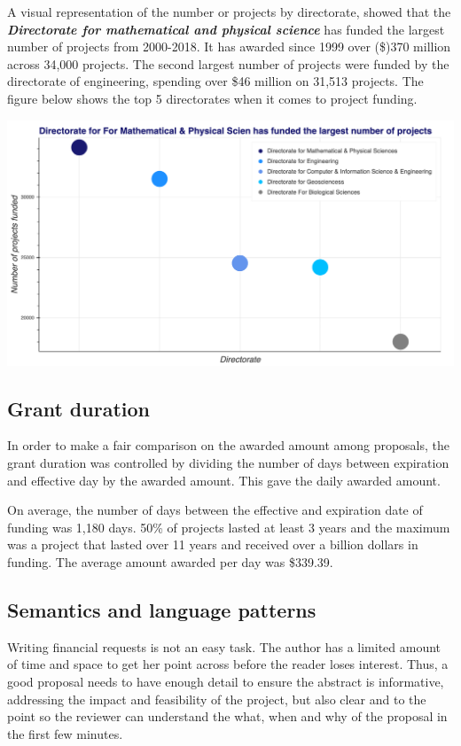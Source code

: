 \documentclass[11pt, oneside]{article}   	%
\begin{document}
A visual representation of the number or projects by directorate, showed that the  \textbf{\emph{Directorate for mathematical and physical science}} has funded the largest number of projects from 2000-2018.  It has awarded since 1999 over (\$)370 million across 34,000 projects. The second largest number of projects were funded by the directorate of engineering, spending over \$46 million on 31,513 projects. The figure below shows the top 5 directorates when it comes to project funding.
 
\includegraphics[width=\textwidth]{awardsperdir}
 
\subsection{Grant duration}
 
In order to make a fair comparison on the awarded amount among proposals, the grant duration was controlled by dividing the number of days between expiration and effective day by the awarded amount. This gave the daily awarded amount.

On average, the number of days between the effective and expiration date of funding was  1,180 days. 50\% of projects lasted at least 3 years and the maximum was a project that lasted over 11 years and received over a billion dollars in funding. The average amount awarded per day was \$339.39.
 
 \subsection{Semantics and language patterns}
 
Writing financial requests is not an easy task. The author has a limited amount of time and space to get her point across before the reader loses interest. Thus, a good proposal needs to have enough detail to ensure the abstract is informative, addressing the impact and feasibility of the project, but also clear and to the point so the reviewer can understand the what, when and why of the proposal in the first few minutes.
\end{document}
